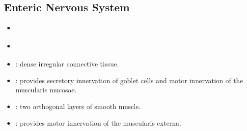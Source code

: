 \begin{itemize}
\begin{multicols}{2}
\begin{itemize}
  \end{itemize}
  \end{multicols}

  \newpage

  \subsection{Enteric Nervous System}
  \begin{multicols}{2}
  \begin{itemize}
    \item {}
    
    \begin{center}
    \end{center}

    \item {}

     \begin{center}
    \end{center}
    
    \item {}: dense irregular connective tissue.

     \begin{center}
    \end{center}

    \item {}: provides secretory innervation of goblet cells and motor innervation of the muscularis mucosae.
    
    \begin{center}
    \end{center}
    
    \item {}: two orthogonal layers of smooth muscle.

     \begin{center}
    \end{center}

    \item {}: provides motor innervation of the muscularis externa.

     \begin{center}
    \end{center}
  \end{itemize}
  \end{multicols}
  
\end{itemize}